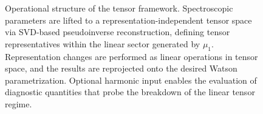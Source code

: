\begin{figure}[ht]
\begin{tikzpicture}
\end{tikzpicture}

\caption{
Operational structure of the tensor framework. Spectroscopic parameters are lifted to a representation-independent tensor space via SVD-based pseudoinverse reconstruction, defining tensor representatives within the linear sector generated by $\mu_1$. Representation changes are performed as linear operations in tensor space, and the results are reprojected onto the desired Watson parametrization. Optional harmonic input enables the evaluation of diagnostic quantities that probe the breakdown of the linear tensor regime.
}

\label{fig:workflow}
\end{figure}

